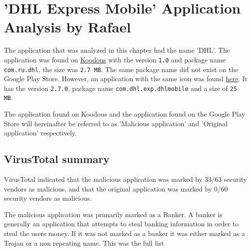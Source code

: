 \section{'DHL Express Mobile' Application Analysis by Rafael}

The application that was analyzed in this chapter had the name 'DHL'.
The application was found on \href{https://koodous.com/apks/38ff459a46e9ea6d63a83c1eddb640626fef562cd1bcb0ab3823c4770d07d0fb}{Koodous} with the version \texttt{1.0} and package name \texttt{com.ru.dhl}, the size was \texttt{2.7 MB}.
The same package name did not exist on the Google Play Store. However, an application with the same icon was found \href{https://play.google.com/store/apps/details?id=com.dhl.exp.dhlmobile}{here}. It has the version \texttt{2.7.0}, package name \texttt{com.dhl.exp.dhlmobile} and a size of \texttt{25 MB}.

The application found on Koodous and the application found on the Google Play Store will hereinafter be referred to as 'Malicious application' and 'Original application' respectively.

\newpage
\subsection{VirusTotal summary}

VirusTotal indicated that the malicious application was marked by 33/63 security vendors as malicious, 
and that the original application was marked by 0/60 security vendors as malicious.

The malicious application was primarily marked as a Banker. 
A banker is generally an application that attempts to steal banking information in order to steal the users money.
If it was not marked as a banker it was either marked as a Trojan or a non repeating name.
This was the full list



